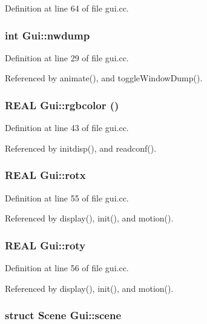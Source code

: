 Definition at line 64 of file gui.cc.\hypertarget{namespaceGui_d5d34028af9532dba173542e87d23f56}{
\subsubsection[{nwdump}]{\setlength{\rightskip}{0pt plus 5cm}int {\bf Gui::nwdump}}}
\label{namespaceGui_d5d34028af9532dba173542e87d23f56}




Definition at line 29 of file gui.cc.

Referenced by animate(), and toggleWindowDump().\hypertarget{namespaceGui_e32ed5f0f6c168d88ee4dcfcb237aa7a}{
\subsubsection[{rgbcolor}]{\setlength{\rightskip}{0pt plus 5cm}REAL {\bf Gui::rgbcolor} ()}}
\label{namespaceGui_e32ed5f0f6c168d88ee4dcfcb237aa7a}




Definition at line 43 of file gui.cc.

Referenced by initdisp(), and readconf().\hypertarget{namespaceGui_67c138887f5c4630c5afd040e7a5294c}{
\subsubsection[{rotx}]{\setlength{\rightskip}{0pt plus 5cm}REAL {\bf Gui::rotx}}}
\label{namespaceGui_67c138887f5c4630c5afd040e7a5294c}




Definition at line 55 of file gui.cc.

Referenced by display(), init(), and motion().\hypertarget{namespaceGui_d638ed2f20a59ff6c2d2b1b6cf1de469}{
\subsubsection[{roty}]{\setlength{\rightskip}{0pt plus 5cm}REAL {\bf Gui::roty}}}
\label{namespaceGui_d638ed2f20a59ff6c2d2b1b6cf1de469}




Definition at line 56 of file gui.cc.

Referenced by display(), init(), and motion().\hypertarget{namespaceGui_ad072e1325427d8e1fbd4d978bce6cf0}{
\subsubsection[{scene}]{\setlength{\rightskip}{0pt plus 5cm}struct {\bf Scene} {\bf Gui::scene}}}
\label{namespaceGui_ad072e1325427d8e1fbd4d978bce6cf0}




